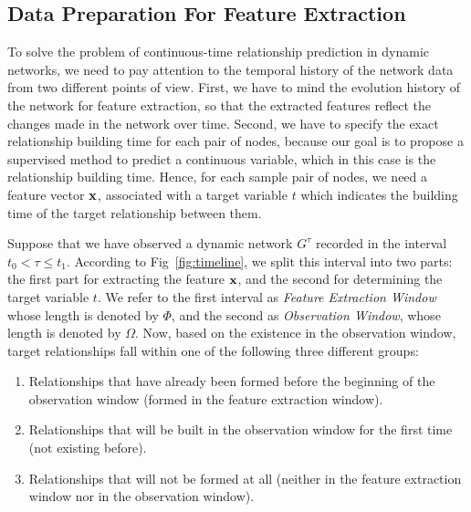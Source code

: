 \subsection{Data Preparation For Feature Extraction}
To solve the problem of continuous-time relationship prediction in dynamic networks, we need to pay attention to the temporal history of the network data from two different points of view. First, we have to mind the evolution history of the network for feature extraction, so that the extracted features reflect the changes made in the network over time. Second, we have to specify the exact relationship building time for each pair of nodes, because our goal is to propose a supervised method to predict a continuous variable, which in this case is the relationship building time. Hence, for each sample pair of nodes, we need a feature vector $\mathbf{x}$, associated with a target variable $t$ which indicates the building time of the target relationship between them.

Suppose that we have observed a dynamic network $G^{\tau}$ recorded in the interval $t_0 <\tau\le t_1$. According to Fig~\ref{fig:timeline}, we split this interval into two parts: the first part for extracting the feature $\mathbf{x}$, and the second for determining the target variable $t$. We refer to the first interval as \emph{Feature Extraction Window} whose length is denoted by $\Phi$, and the second as \emph{Observation Window}, whose length is denoted by $\Omega$. Now, based on the existence in the observation window, target relationships fall within one of the following three different groups:

\begin{enumerate}
	\item Relationships that have already been formed before the beginning of the observation window (formed in the feature extraction window).
	\item Relationships that will be built in the observation window for the first time (not existing before).
	\item Relationships that will not be formed at all (neither in the feature extraction window nor in the observation window).
\end{enumerate}

